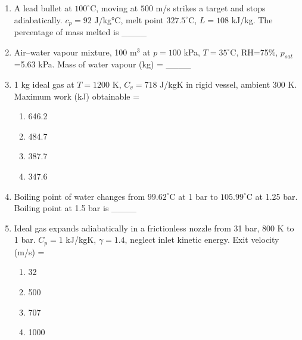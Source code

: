 \documentclass[journal,12pt,onecolumn]{IEEEtran}
\begin{document}
\begin{enumerate}[label=\arabic*)]
\item A lead bullet at $100^\circ$C, moving at $500$ m/s strikes a target and stops adiabatically. $c_p=92$ J/kg°C, melt point $327.5^\circ$C, $L=108$ kJ/kg. The percentage of mass melted is \_\_\_\_
\hfill{} \\

\vspace{0.5cm}

\item Air–water vapour mixture, 100 m$^3$ at $p=100$ kPa, $T=35^\circ$C, RH=75\%, $p_{sat}$=5.63 kPa. Mass of water vapour (kg) = \_\_\_\_
\hfill{} \\

\newpage

\item 1 kg ideal gas at $T=1200$ K, $C_v=718$ J/kgK in rigid vessel, ambient 300 K. Maximum work (kJ) obtainable =  
\hfill{} \\

\vspace{0.2cm}
\begin{enumerate}[label=\alph*)]
\item 646.2
\item 484.7
\item 387.7
\item 347.6
\end{enumerate}
\vspace{0.5cm}

\item Boiling point of water changes from $99.62^\circ$C at 1 bar to $105.99^\circ$C at 1.25 bar. Boiling point at 1.5 bar is \_\_\_\_
\hfill{} \\

\vspace{0.5cm}

\item Ideal gas expands adiabatically in a frictionless nozzle from 31 bar, 800 K to 1 bar. $C_p=1$ kJ/kgK, $\gamma=1.4$, neglect inlet kinetic energy. Exit velocity (m/s) =  
\hfill{} \\

\vspace{0.2cm}
\begin{enumerate}[label=\alph*)]
\item 32
\item 500
\item 707
\item 1000
\end{enumerate}
\vspace{0.5cm}


\end{enumerate}
\end{document}
